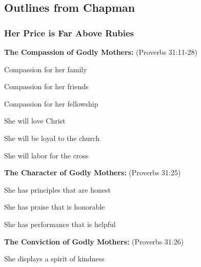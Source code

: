 \subsection{Outlines from Chapman}

\subsubsection{Her Price is Far Above Rubies}
\begin{compactenum}[I.]
    \item \textbf{The Compassion of Godly Mothers:}  (Proverbs 31:11-28)
    \begin{compactenum}[A.]
        \item Compassion for her family
        \item Compassion for her friends
        \item Compassion for her fellowship
        \begin{compactenum}[1.]
            \item She will love Christ
            \item She will be loyal to the church 
            \item She will labor for the cross
        \end{compactenum}
    \end{compactenum}
    \item \textbf{The Character of Godly Mothers:}  (Proverbs 31:25)
    \begin{compactenum}[A.]
        \item She has principles that are honest 
        \item She has praise that is honorable
        \item She has performance that is helpful
    \end{compactenum}
    \item \textbf{The Conviction of Godly Mothers:}  (Proverbs 31:26)
    \begin{compactenum}[A.]
        \item She displays a spirit of kindness

\end{compactenum}
\end{compactenum}
